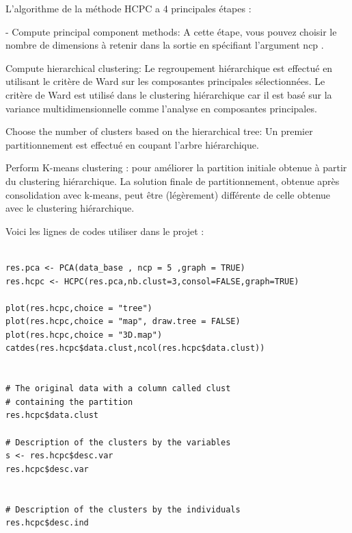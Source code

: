 \documentclass[12pt]{article}
\begin{document}
L'algorithme de la méthode HCPC a 4 principales étapes :

- Compute principal component methods: A cette étape, vous pouvez choisir le nombre de dimensions à retenir dans la sortie en spécifiant l'argument ncp .

Compute hierarchical clustering: Le regroupement hiérarchique est effectué en utilisant le critère de Ward sur les composantes principales sélectionnées. Le critère de Ward est utilisé dans le clustering hiérarchique car il est basé sur la variance multidimensionnelle comme l'analyse en composantes principales.

Choose the number of clusters based on the hierarchical tree: Un premier partitionnement est effectué en coupant l'arbre hiérarchique.

Perform K-means clustering : pour améliorer la partition initiale obtenue à partir du clustering hiérarchique. La solution finale de partitionnement, obtenue après consolidation avec k-means, peut être (légèrement) différente de celle obtenue avec le clustering hiérarchique.

Voici les lignes de codes utiliser dans le projet :

\begin{lstlisting}

res.pca <- PCA(data_base , ncp = 5 ,graph = TRUE)
res.hcpc <- HCPC(res.pca,nb.clust=3,consol=FALSE,graph=TRUE)

plot(res.hcpc,choice = "tree")
plot(res.hcpc,choice = "map", draw.tree = FALSE)
plot(res.hcpc,choice = "3D.map")
catdes(res.hcpc$data.clust,ncol(res.hcpc$data.clust))


# The original data with a column called clust 
# containing the partition
res.hcpc$data.clust

# Description of the clusters by the variables
s <- res.hcpc$desc.var
res.hcpc$desc.var


# Description of the clusters by the individuals
res.hcpc$desc.ind

\end{lstlisting}
\end{document}
